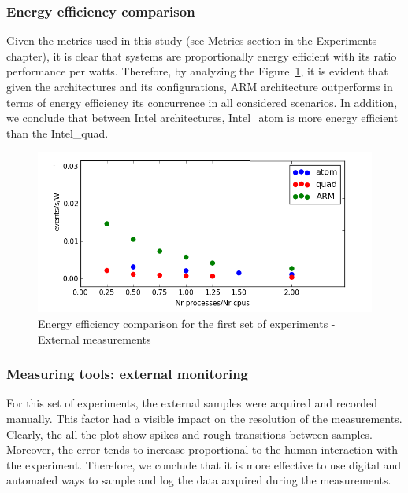 \subsubsection*{Energy efficiency comparison}
Given the metrics used in this study (see Metrics section in the Experiments chapter), it is clear that  
systems are  proportionally energy efficient with its ratio performance per 
watts. Therefore, by analyzing the Figure~\ref{fig:aalto_all_results}, it is evident that given the architectures and its configurations, ARM architecture outperforms in terms of energy efficiency its concurrence in all considered 
scenarios. In addition, we conclude that between Intel architectures, Intel\_atom is more energy efficient than the Intel\_quad. 

\begin{figure}[h]
  \centering
    \includegraphics[width=150mm]{"img/aalto/aalto_all_results"}
    \caption{Energy efficiency comparison for the first set of experiments - External measurements}
    \label{fig:aalto_all_results}
\end{figure}

\subsubsection*{Measuring tools: external monitoring}
For this set of experiments, the external samples were acquired and recorded 
manually. This factor had a visible impact on the resolution of the measurements. Clearly,
the all the plot show spikes and rough transitions between samples. Moreover, the error
tends to increase proportional to the human interaction with the experiment. 
Therefore, we conclude that it is more effective to use digital and automated ways to sample and
log the data acquired during the measurements.

